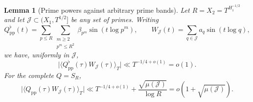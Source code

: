 \documentclass[11pt,reqno]{amsart}
\numberwithin{equation}{section}
\newtheorem{lemma}[theorem]{Lemma}
\begin{document}
\begin{lemma}[Prime powers against arbitrary prime bands]
\label{lem:discretepp}
Let $R=X_2=T^{H_1^{-1/2}}$ and let
$\mathcal J\subset(X_1,T^{1/2}]$ be any set of primes.
Writing
\begin{equation}\label{eq:pptest}
 Q_{\mathrm{pp}}^\flat(t)
=\sum_{p\le R}\sum_{\substack{m\ge2\\p^m\le R^2}}
\beta_{p^m}\sin(t\log p^m),\qquad
 W_{\mathcal J}(t)=\sum_{q\in\mathcal J}a_q\sin(t\log q),
\end{equation}
we have, uniformly in $\mathcal J$,
\begin{equation}\label{eq:ppcorrelation}
\bigl|\langle Q_{\mathrm{pp}}^\flat(\tau)
W_{\mathcal J}(\tau)\rangle_T\bigr|
\ll T^{-1/4+o(1)}=o(1).
\end{equation}
For the complete $Q=S_R$,
\begin{equation}\label{eq:ppfullcorr}
\bigl|\langle Q_{\mathrm{pp}}(\tau)
W_{\mathcal J}(\tau)\rangle_T\bigr|
\ll T^{-1/4+o(1)}+
\frac{\sqrt{\mu(\mathcal J)}}{\log R}
=o(1+\sqrt{\mu(\mathcal J)}).
\end{equation}
\end{lemma}
\end{document}
